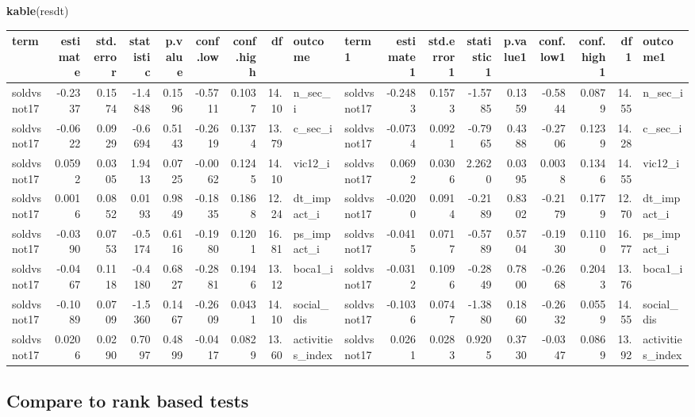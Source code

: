\documentclass[11pt,]{article}
\newenvironment{Shaded}{\begin{snugshade}}{\end{snugshade}}
\newcommand{\KeywordTok}[1]{\textcolor[rgb]{0.13,0.29,0.53}{\textbf{#1}}}
\newcommand{\NormalTok}[1]{#1}
\begin{document}
\begin{Shaded}
\begin{Highlighting}[]
\KeywordTok{kable}\NormalTok{(resdt)}
\end{Highlighting}
\end{Shaded}

\begin{longtable}[]{@{}lrrrrrrrllrrrrrrrl@{}}
\toprule
term & estimate & std.error & statistic & p.value & conf.low & conf.high
& df & outcome & term1 & estimate1 & std.error1 & statistic1 & p.value1
& conf.low1 & conf.high1 & df1 & outcome1\tabularnewline
\midrule
\endhead
soldvsnot17 & -0.2337 & 0.1574 & -1.4848 & 0.1596 & -0.5711 & 0.1037 &
14.10 & n\_sec\_i & soldvsnot17 & -0.2483 & 0.1573 & -1.5785 & 0.1359 &
-0.5844 & 0.0879 & 14.55 & n\_sec\_i\tabularnewline
soldvsnot17 & -0.0622 & 0.0929 & -0.6694 & 0.5143 & -0.2619 & 0.1374 &
13.79 & c\_sec\_i & soldvsnot17 & -0.0734 & 0.0921 & -0.7965 & 0.4388 &
-0.2706 & 0.1239 & 14.28 & c\_sec\_i\tabularnewline
soldvsnot17 & 0.0592 & 0.0305 & 1.9413 & 0.0725 & -0.0062 & 0.1245 &
14.10 & vic12\_i & soldvsnot17 & 0.0692 & 0.0306 & 2.2620 & 0.0395 &
0.0038 & 0.1346 & 14.55 & vic12\_i\tabularnewline
soldvsnot17 & 0.0016 & 0.0852 & 0.0193 & 0.9849 & -0.1835 & 0.1868 &
12.24 & dt\_impact\_i & soldvsnot17 & -0.0200 & 0.0914 & -0.2189 &
0.8302 & -0.2179 & 0.1779 & 12.70 & dt\_impact\_i\tabularnewline
soldvsnot17 & -0.0390 & 0.0753 & -0.5174 & 0.6116 & -0.1980 & 0.1201 &
16.81 & ps\_impact\_i & soldvsnot17 & -0.0415 & 0.0717 & -0.5789 &
0.5704 & -0.1930 & 0.1100 & 16.77 & ps\_impact\_i\tabularnewline
soldvsnot17 & -0.0467 & 0.1118 & -0.4180 & 0.6827 & -0.2881 & 0.1946 &
13.12 & boca1\_i & soldvsnot17 & -0.0312 & 0.1096 & -0.2849 & 0.7800 &
-0.2668 & 0.2043 & 13.76 & boca1\_i\tabularnewline
soldvsnot17 & -0.1089 & 0.0709 & -1.5360 & 0.1467 & -0.2609 & 0.0431 &
14.10 & social\_dis & soldvsnot17 & -0.1036 & 0.0747 & -1.3880 & 0.1860
& -0.2632 & 0.0559 & 14.55 & social\_dis\tabularnewline
soldvsnot17 & 0.0206 & 0.0290 & 0.7097 & 0.4899 & -0.0417 & 0.0829 &
13.60 & activities\_index & soldvsnot17 & 0.0261 & 0.0283 & 0.9205 &
0.3730 & -0.0347 & 0.0869 & 13.92 & activities\_index\tabularnewline
\bottomrule
\end{longtable}

\normalsize

\hypertarget{compare-to-rank-based-tests}{%
\subsection{Compare to rank based
tests}\label{compare-to-rank-based-tests}}
\end{document}
